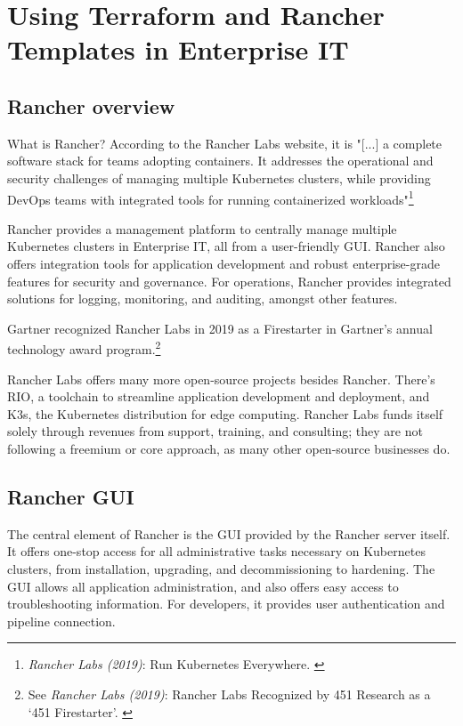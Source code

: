 %
%

\pagebreak
\section{Using Terraform and Rancher Templates in Enterprise IT}

\onehalfspacing

\subsection{Rancher overview}

What is Rancher? According to the Rancher Labs website, it is "[...] a complete software stack for teams adopting containers. It addresses the operational and security challenges of managing multiple Kubernetes clusters, while providing DevOps teams with integrated tools for running containerized workloads"\footnote{\textit{Rancher Labs (2019)}: Run Kubernetes Everywhere. \cite{rancher}}

Rancher provides a management platform to centrally manage multiple Kubernetes clusters in Enterprise IT, all from a user-friendly GUI. Rancher also offers integration tools for application development and robust enterprise-grade features for security and governance. For operations, Rancher provides integrated solutions for logging, monitoring, and auditing, amongst other features.

Gartner recognized Rancher Labs in 2019 as a Firestarter in Gartner's annual technology award program.\footnote{See \textit{Rancher Labs (2019)}: Rancher Labs Recognized by 451 Research as a ‘451 Firestarter’. \cite{firestarter451}}

Rancher Labs offers many more open-source projects besides Rancher. There's RIO, a toolchain to streamline application development and deployment, and K3s, the Kubernetes distribution for edge computing. Rancher Labs funds itself solely through revenues from support, training, and consulting; they are not following a freemium or core approach, as many other open-source businesses do.

\subsection{Rancher GUI}

The central element of Rancher is the GUI provided by the Rancher server itself. It offers one-stop access for all administrative tasks necessary on Kubernetes clusters, from installation, upgrading, and decommissioning to hardening. The GUI allows all application administration, and also offers easy access to troubleshooting information. For developers, it provides user authentication and pipeline connection.

